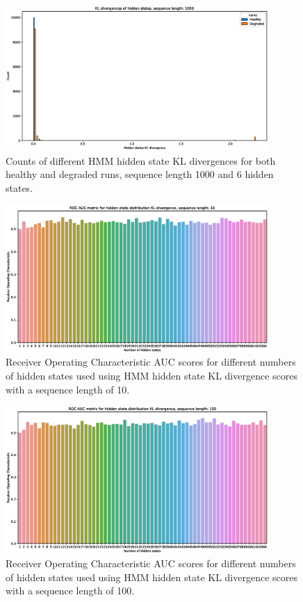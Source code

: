 \documentclass[journal]{IEEEtran}
\begin{document}
\begin{figure}[h]
 \centering
 \includegraphics[width=10cm,keepaspectratio=true]{./kl_histograms_1000.eps}
 \caption{Counts of different HMM hidden state KL divergences for both healthy and degraded runs, sequence length 1000 and 6 hidden states.}
 \label{figure:kl_1000}
\end{figure}

\begin{figure}[h]
 \centering
 \includegraphics[width=10cm,keepaspectratio=true]{./roc_kl_score_10.eps}
 \caption{Receiver Operating Characteristic AUC scores for different numbers of hidden states used using HMM hidden state KL divergence scores with a sequence length of 10.}
 \label{figure:roc_kl_10}
\end{figure}

\begin{figure}[h]
 \centering
 \includegraphics[width=10cm,keepaspectratio=true]{./roc_kl_score_100.eps}
 \caption{Receiver Operating Characteristic AUC scores for different numbers of hidden states used using HMM hidden state KL divergence scores with a sequence length of 100.}
 \label{figure:roc_kl_100}
\end{figure}
\end{document}
